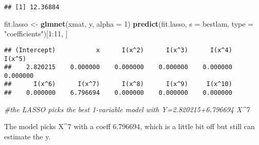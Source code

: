 \documentclass[]{article}
\newenvironment{Shaded}{\begin{snugshade}}{\end{snugshade}}
\newcommand{\KeywordTok}[1]{\textcolor[rgb]{0.13,0.29,0.53}{\textbf{{#1}}}}
\newcommand{\DataTypeTok}[1]{\textcolor[rgb]{0.13,0.29,0.53}{{#1}}}
\newcommand{\DecValTok}[1]{\textcolor[rgb]{0.00,0.00,0.81}{{#1}}}
\newcommand{\StringTok}[1]{\textcolor[rgb]{0.31,0.60,0.02}{{#1}}}
\newcommand{\CommentTok}[1]{\textcolor[rgb]{0.56,0.35,0.01}{\textit{{#1}}}}
\newcommand{\NormalTok}[1]{{#1}}
\begin{document}
\begin{Shaded}
\end{Shaded}

\begin{verbatim}
## [1] 12.36884
\end{verbatim}

\begin{Shaded}
\begin{Highlighting}[]
\NormalTok{fit.lasso <-}\StringTok{ }\KeywordTok{glmnet}\NormalTok{(xmat, y, }\DataTypeTok{alpha =} \DecValTok{1}\NormalTok{)}
\KeywordTok{predict}\NormalTok{(fit.lasso, }\DataTypeTok{s =} \NormalTok{bestlam, }\DataTypeTok{type =} \StringTok{"coefficients"}\NormalTok{)[}\DecValTok{1}\NormalTok{:}\DecValTok{11}\NormalTok{, ]}
\end{Highlighting}
\end{Shaded}

\begin{verbatim}
## (Intercept)           x      I(x^2)      I(x^3)      I(x^4)      I(x^5) 
##    2.820215    0.000000    0.000000    0.000000    0.000000    0.000000 
##      I(x^6)      I(x^7)      I(x^8)      I(x^9)     I(x^10) 
##    0.000000    6.796694    0.000000    0.000000    0.000000
\end{verbatim}

\begin{Shaded}
\begin{Highlighting}[]
\CommentTok{#the LASSO picks the best 1-variable model with Y=2.820215+6.796694 X^7}
\end{Highlighting}
\end{Shaded}

The model picks X\^{}7 with a coeff 6.796694, which is a little bit off
but still can estimate the y.
\end{document}
